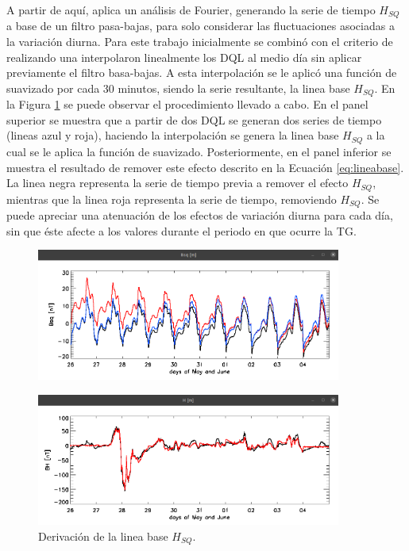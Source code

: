 A partir de aquí, \cite{vanKampt} aplica un análisis de Fourier, generando la serie de tiempo $H_{SQ}$ a base de un filtro pasa-bajas, para solo considerar las fluctuaciones asociadas a la variación diurna. Para este trabajo inicialmente se combinó con el criterio de \cite{baseline_Gjerloev} realizando una interpolaron linealmente los DQL al medio día sin aplicar previamente el filtro basa-bajas. A esta interpolación se le aplicó una función de suavizado por cada 30 minutos, siendo la serie resultante, la linea base $H_{SQ}$. En la Figura \ref{fig:diasq} se puede observar el procedimiento llevado a cabo. En el panel superior se muestra que a partir de dos DQL se generan dos series de tiempo (lineas azul y roja), haciendo la interpolación se genera la linea base $H_{SQ}$ a la cual se le aplica la función de suavizado. Posteriormente, en el panel inferior se muestra el resultado de remover este efecto descrito en la Ecuación \ref{eq:lineabase}. La linea negra representa la serie de tiempo previa a remover el efecto $H_{SQ}$, mientras que la linea roja representa la serie de tiempo, removiendo $H_{SQ}$. Se puede apreciar una atenuación de los efectos de variación diurna para cada día, sin que éste afecte a los valores durante el periodo en que ocurre la TG.
\vspace{1 em}


\begin{figure}[h!]
    \centering
    \centerline{\Large \bf   
         \hfill}
          \centerline{\Large \bf   
         \hfill}
     \includegraphics[width=10.0cm]{Images/cap2/lineabase/diurno/sq.png}
     \centerline{\Large \bf   
         \hfill}
     \includegraphics[width=10.0cm]{Images/cap2/lineabase/diurno/sq2.png}            
       \caption{Derivación de la linea base $H_{SQ}$.}
    \label{fig:diasq}
\end{figure}


